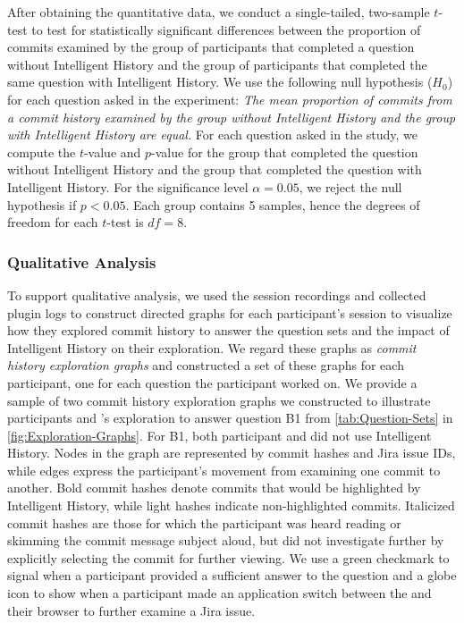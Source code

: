 After obtaining the quantitative data, we conduct a single-tailed, two-sample $t$-test to test for statistically significant differences 
between the proportion of commits examined by the group of participants that completed a question without Intelligent History and the group of participants 
that completed the same question with Intelligent History.
We use the following null hypothesis ($H_{0}$) for each question asked in the experiment: 
\textit{The mean proportion of commits from a commit history examined by the group without Intelligent History and the group with Intelligent History are equal.}
For each question asked in the study, we compute the $t$-value and $p$-value for the group that completed 
the question without Intelligent History and the group that completed the question with Intelligent History.
For the significance level $\alpha = 0.05$, we reject the null hypothesis if $p < 0.05$.
Each group contains 5 samples, hence the degrees of freedom for each $t$-test is $df = 8$.

\subsubsection{Qualitative Analysis}

To support qualitative analysis, we used the session recordings and collected plugin logs to construct directed graphs 
for each participant's session to visualize how they explored commit history to answer the question sets 
and the impact of Intelligent History on their exploration.
We regard these graphs as \emph{commit history exploration graphs} and constructed a set of these graphs for each participant, 
one for each question the participant worked on.
We provide a sample of two commit history exploration graphs we constructed to illustrate 
participants  and ’s exploration to answer question B1 
from \autoref{tab:Question-Sets} in \autoref{fig:Exploration-Graphs}.
For B1, both participant  and  did not use Intelligent History.
Nodes in the graph are represented by commit hashes and Jira issue IDs, 
while edges express the participant's movement from examining one commit to another.
Bold commit hashes denote commits that would be highlighted by Intelligent History, 
while light hashes indicate non-highlighted commits.
Italicized commit hashes are those for which the participant was heard reading or skimming the commit message subject aloud, 
but did not investigate further by explicitly selecting the commit for further viewing.
We use a green checkmark to signal when a participant provided a sufficient answer to the question 
and a globe icon to show when a participant made an application switch between the  
and their browser to further examine a Jira issue.

